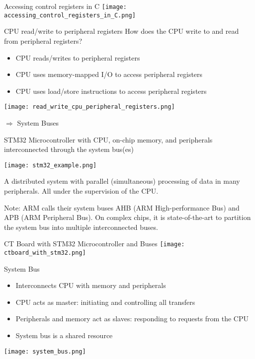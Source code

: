 \begin{examplecode}{Accessing control registers in C}
    \texttt{[image: accessing\_control\_registers\_in\_C.png]}
\end{examplecode}

\begin{concept}{CPU read/write to peripheral registers}
    How does the CPU write to and read from peripheral registers?
    \begin{itemize}
        \item CPU reads/writes to peripheral registers
        \item CPU uses memory-mapped I/O to access peripheral registers
        \item CPU uses load/store instructions to access peripheral registers
    \end{itemize}
    \texttt{[image: read\_write\_cpu\_peripheral\_registers.png]}

    $\Rightarrow$ System Buses
\end{concept}

\begin{example2}{STM32 Microcontroller}
    with CPU, on-chip memory, and peripherals interconnected through the system bus(es)

    \texttt{[image: stm32\_example.png]}

    A distributed system with parallel (simultaneous) processing of data in many peripherals. All under the supervision of the CPU.
\end{example2}

\begin{remark}
    Note: ARM calls their system buses AHB (ARM High-performance Bus) and APB (ARM
    Peripheral Bus). On complex chips, it is state-of-the-art to partition the system bus into
    multiple interconnected buses.
\end{remark}

\begin{example2}{CT Board with STM32 Microcontroller and Buses}
    \texttt{[image: ctboard\_with\_stm32.png]}
\end{example2}

\begin{definition}{System Bus}
    \begin{itemize}
        \item Interconnects CPU with memory and peripherals
        \item CPU acts as master: initiating and controlling all transfers
        \item Peripherals and memory act as slaves: responding to requests from the CPU
        \item System bus is a shared resource
    \end{itemize}
    \texttt{[image: system\_bus.png]}
\end{definition}


